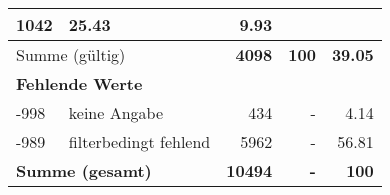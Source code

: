 \begin{longtable}{lXrrr}
       \num{1042} &
       \num[round-mode=places,round-precision=2]{25,43} &
         \num[round-mode=places,round-precision=2]{9,93} \\
     \midrule
     \multicolumn{2}{l}{Summe (gültig)} &
       \textbf{\num{4098}} &
     \textbf{100} &
       \textbf{\num[round-mode=places,round-precision=2]{39,05}} \\
     \multicolumn{5}{l}{\textbf{Fehlende Werte}}\\
       -998 &
       keine Angabe &
         \num{434} &
        - &
         \num[round-mode=places,round-precision=2]{4,14} \\
       -989 &
       filterbedingt fehlend &
         \num{5962} &
        - &
         \num[round-mode=places,round-precision=2]{56,81} \\
     \midrule
     \multicolumn{2}{l}{\textbf{Summe (gesamt)}} &
          \textbf{\num{10494}} &
        \textbf{-} &
        \textbf{100} \\
     \bottomrule
     \end{longtable}
     
